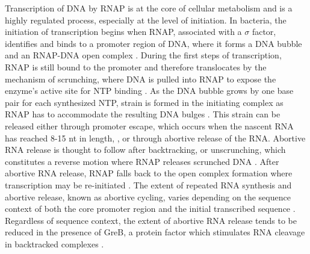 %
Transcription of DNA by RNAP is at the core of cellular metabolism and is a
highly regulated process, especially at the level of initiation. In bacteria,
the initiation of transcription begins when RNAP, associated with a $\sigma$
factor, identifies and binds to a promoter region of DNA, where it forms a DNA
bubble and an RNAP-DNA open complex \cite{saecker_mechanism_2011}. During the
first steps of transcription, RNAP is still bound to the promoter and
therefore translocates by the mechanism of scrunching, where DNA is pulled
into RNAP to expose the enzyme's active site for NTP binding
\cite{revyakin_abortive_2006, kapanidis_initial_2006}. As the DNA bubble grows
by one base pair for each synthesized NTP, strain is formed in the initiating
complex as RNAP has to accommodate the resulting DNA bulges
\cite{straney_stressed_1987, kapanidis_initial_2006,
winkelman_crosslink_2015}. This strain can be released either through promoter
escape, which occurs when the nascent RNA has
reached 8-15 nt in length, \cite{carpousis_cycling_1980,
hsu_vitro_2003, tang_real-time_2009, hsu_initial_2006}, or through abortive
release of the RNA. Abortive RNA release is thought to follow after
backtracking, or unscrunching, which constitutes a reverse motion where RNAP
releases scrunched DNA \cite{hsu_escherichia_1995, feng_grea-induced_1994,
hsu_initial_2006}. After abortive RNA release, RNAP falls back to the open
complex formation where transcription may be re-initiated
\cite{carpousis_cycling_1980}. The extent of repeated RNA synthesis and
abortive release, known as abortive cycling, varies depending on the sequence
context of both the core promoter region and the initial transcribed sequence
\cite{hsu_initial_2006, hsu_promoter_2002, vo_vitro_2003,
skancke_sequence-dependent_2015}. Regardless of sequence context, the extent
of abortive RNA release tends to be reduced in the presence of GreB, a protein
factor which stimulates RNA cleavage in backtracked complexes
\cite{hsu_initial_2006}.

